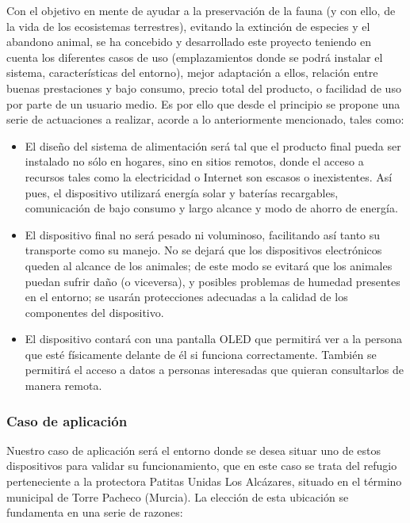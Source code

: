 \documentclass[12pt]{article}
\begin{document}
	\noindent Con el objetivo en mente de ayudar a la preservación de la fauna (y con ello, de la vida de los ecosistemas terrestres), evitando la extinción de especies y el abandono animal, se ha concebido y desarrollado este proyecto teniendo en cuenta los diferentes casos de uso (emplazamientos donde se podrá instalar el sistema, características del entorno), mejor adaptación a ellos, relación entre buenas prestaciones y bajo consumo, precio total del producto, o facilidad de uso por parte de un usuario medio. Es por ello que desde el principio se propone una serie de actuaciones a realizar, acorde a lo anteriormente mencionado, tales como: \\
	
	\begin{itemize}
		\item El diseño del sistema de alimentación será tal que el producto final pueda ser instalado no sólo en hogares, sino en sitios remotos, donde el acceso a recursos tales como la electricidad o Internet son escasos o inexistentes. Así pues, el dispositivo utilizará energía solar y baterías recargables, comunicación de bajo consumo y largo alcance y modo de ahorro de energía. 
		\item El dispositivo final no será pesado ni voluminoso, facilitando así tanto su transporte como su manejo. No se dejará que los dispositivos electrónicos queden al alcance de los animales; de este modo se evitará que los animales puedan sufrir daño (o viceversa), y posibles problemas de humedad presentes en el entorno; se usarán protecciones adecuadas a la calidad de los componentes del dispositivo.
		\item El dispositivo contará con una pantalla OLED que permitirá ver a la persona que esté físicamente delante de él si funciona correctamente. También se permitirá el acceso a datos a personas interesadas que quieran consultarlos de manera remota.

	\end{itemize}

	
	\subsubsection[Caso de aplicación]{Caso de aplicación}
	
		Nuestro caso de aplicación será el entorno donde se desea situar uno de estos dispositivos para validar su funcionamiento, que en este caso se trata del refugio perteneciente a la protectora Patitas Unidas Los Alcázares, situado en el término municipal de Torre Pacheco (Murcia).
	La elección de esta ubicación se fundamenta en una serie de razones:
	
\end{document}
